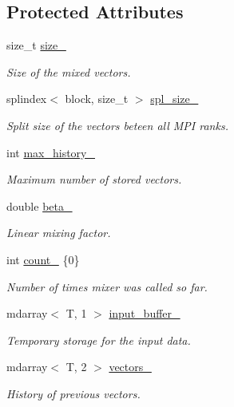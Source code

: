 \subsection*{Protected Attributes}
\begin{DoxyCompactItemize}
\item 
size\+\_\+t \hyperlink{classsirius_1_1_mixer_a7f77b0acd3bf803dc9c031f77faed796}{size\+\_\+}
\begin{DoxyCompactList}\small\item\em Size of the mixed vectors. \end{DoxyCompactList}\item 
splindex$<$ block, size\+\_\+t $>$ \hyperlink{classsirius_1_1_mixer_aefc6f985f3f6d4469d714a7a06fdbb25}{spl\+\_\+size\+\_\+}
\begin{DoxyCompactList}\small\item\em Split size of the vectors beteen all M\+P\+I ranks. \end{DoxyCompactList}\item 
int \hyperlink{classsirius_1_1_mixer_ab7530cd633c6b0153ee3e2a482d42aa7}{max\+\_\+history\+\_\+}
\begin{DoxyCompactList}\small\item\em Maximum number of stored vectors. \end{DoxyCompactList}\item 
double \hyperlink{classsirius_1_1_mixer_a41a4d228e3a0bbf5e1ec7b91356fe4b0}{beta\+\_\+}
\begin{DoxyCompactList}\small\item\em Linear mixing factor. \end{DoxyCompactList}\item 
int \hyperlink{classsirius_1_1_mixer_adced2a7404dfce163d13420a6a97fee9}{count\+\_\+} \{0\}
\begin{DoxyCompactList}\small\item\em Number of times mixer was called so far. \end{DoxyCompactList}\item 
mdarray$<$ T, 1 $>$ \hyperlink{classsirius_1_1_mixer_a54eab77660d00c984d0a065a74e5ac0b}{input\+\_\+buffer\+\_\+}
\begin{DoxyCompactList}\small\item\em Temporary storage for the input data. \end{DoxyCompactList}\item 
mdarray$<$ T, 2 $>$ \hyperlink{classsirius_1_1_mixer_ab3a7332aa714b37c229008b68dab2d5a}{vectors\+\_\+}
\begin{DoxyCompactList}\small\item\em History of previous vectors. \end{DoxyCompactList}\item 

\end{DoxyCompactItemize}
